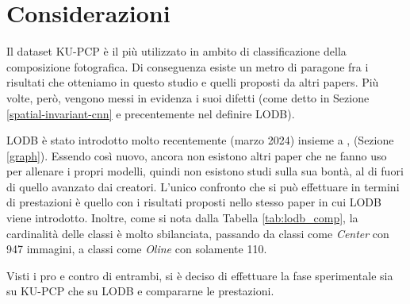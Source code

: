 \section{Considerazioni}
Il dataset KU-PCP è il più utilizzato in ambito di classificazione della composizione fotografica. Di conseguenza esiste un metro di paragone fra i risultati che otteniamo in questo studio e quelli proposti da altri papers. Più volte, però, vengono messi in evidenza i suoi difetti (come detto in Sezione \ref{spatial-invariant-cnn} e precentemente nel definire LODB). 

LODB è stato introdotto molto recentemente (marzo 2024) insieme a \cite{graph}, (Sezione \ref{graph}). Essendo così nuovo, ancora non esistono altri paper che ne fanno uso per allenare i propri modelli, quindi non esistono studi sulla sua bontà, al di fuori di quello avanzato dai creatori. L'unico confronto che si può effettuare in termini di prestazioni è quello con i risultati proposti nello stesso paper \cite{graph} in cui LODB viene introdotto. Inoltre, come si nota dalla Tabella \ref{tab:lodb_comp}, la cardinalità delle classi è molto sbilanciata, passando da classi come \textit{Center} con 947 immagini, a classi come \textit{Oline} con solamente 110.

Visti i pro e contro di entrambi, si è deciso di effettuare la fase sperimentale sia su KU-PCP che su LODB e compararne le prestazioni.